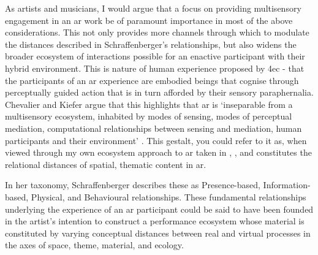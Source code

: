 As artists and musicians, I would argue that a focus on providing multisensory engagement in an \gls{ar} work be of paramount importance in most of the above considerations. This not only provides more channels through which to modulate the distances described in Schraffenberger's relationships, but also widens the broader ecosystem of interactions possible for an enactive participant with their hybrid environment. This is nature of human experience proposed by \gls{4ec} - that the participants of an \gls{ar} experience are embodied beings that cognise through perceptually guided action that is in turn afforded by their sensory paraphernalia. 
Chevalier and Kiefer argue that this highlights that \gls{ar} is `inseparable from a multisensory ecosystem, inhabited by modes of sensing, modes of perceptual mediation, computational relationships between sensing and mediation, human participants and their environment' \citeyearpar[p. 4]{chevalier2020}. This gestalt, you could refer to it as, when viewed through my own ecosystem approach to \gls{ar} taken in \textit{}, \textit{}, and \textit{} constitutes the relational distances of spatial, thematic content in \gls{ar}. 

In her taxonomy, Schraffenberger describes these as Presence-based, Information-based, Physical, and Behavioural relationships. These fundamental relationships underlying the experience of an \gls{ar} participant could be said to have been founded in the artist's intention to construct a performance ecosystem whose material is constituted by varying conceptual distances between real and virtual processes in the axes of space, theme, material, and ecology. 


